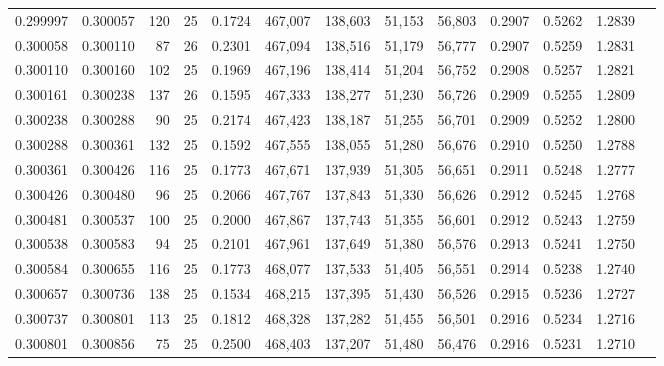 \begin{tabular}{rrrrrrrrrrrrr}
0.299997 & 0.300057 &   120 &  25 &                                     0.1724 & 467,007 & 138,603 &  51,153 &  56,803 & 0.2907 & 0.5262 & 1.2839 \\
0.300058 & 0.300110 &    87 &  26 &                                     0.2301 & 467,094 & 138,516 &  51,179 &  56,777 & 0.2907 & 0.5259 & 1.2831 \\
0.300110 & 0.300160 &   102 &  25 &                                     0.1969 & 467,196 & 138,414 &  51,204 &  56,752 & 0.2908 & 0.5257 & 1.2821 \\
0.300161 & 0.300238 &   137 &  26 &                                     0.1595 & 467,333 & 138,277 &  51,230 &  56,726 & 0.2909 & 0.5255 & 1.2809 \\
0.300238 & 0.300288 &    90 &  25 &                                     0.2174 & 467,423 & 138,187 &  51,255 &  56,701 & 0.2909 & 0.5252 & 1.2800 \\
0.300288 & 0.300361 &   132 &  25 &                                     0.1592 & 467,555 & 138,055 &  51,280 &  56,676 & 0.2910 & 0.5250 & 1.2788 \\
0.300361 & 0.300426 &   116 &  25 &                                     0.1773 & 467,671 & 137,939 &  51,305 &  56,651 & 0.2911 & 0.5248 & 1.2777 \\
0.300426 & 0.300480 &    96 &  25 &                                     0.2066 & 467,767 & 137,843 &  51,330 &  56,626 & 0.2912 & 0.5245 & 1.2768 \\
0.300481 & 0.300537 &   100 &  25 &                                     0.2000 & 467,867 & 137,743 &  51,355 &  56,601 & 0.2912 & 0.5243 & 1.2759 \\
0.300538 & 0.300583 &    94 &  25 &                                     0.2101 & 467,961 & 137,649 &  51,380 &  56,576 & 0.2913 & 0.5241 & 1.2750 \\
0.300584 & 0.300655 &   116 &  25 &                                     0.1773 & 468,077 & 137,533 &  51,405 &  56,551 & 0.2914 & 0.5238 & 1.2740 \\
0.300657 & 0.300736 &   138 &  25 &                                     0.1534 & 468,215 & 137,395 &  51,430 &  56,526 & 0.2915 & 0.5236 & 1.2727 \\
0.300737 & 0.300801 &   113 &  25 &                                     0.1812 & 468,328 & 137,282 &  51,455 &  56,501 & 0.2916 & 0.5234 & 1.2716 \\
0.300801 & 0.300856 &    75 &  25 &                                     0.2500 & 468,403 & 137,207 &  51,480 &  56,476 & 0.2916 & 0.5231 & 1.2710 \\

\end{tabular}
